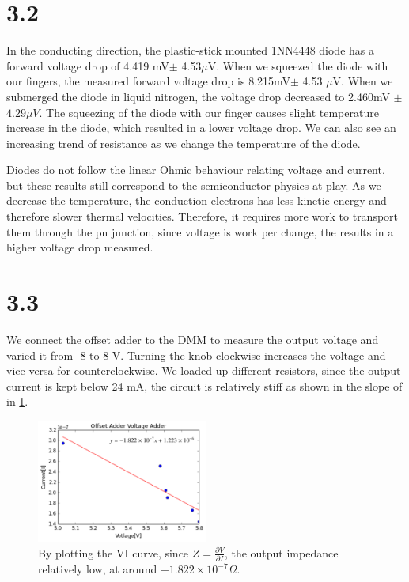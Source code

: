 \documentclass[authoryear, 12pt,5p, times]{elsarticle}
\begin{document}
\section*{3.2}
In the conducting direction, the plastic-stick mounted 1NN4448 diode has a forward voltage drop of 4.419 mV$\pm$ 4.53$\mu$V.  When we squeezed the diode with our fingers, the measured forward voltage drop is 8.215mV$\pm$ 4.53 $\mu$V. When we submerged the diode in liquid nitrogen, the voltage drop decreased to 2.460mV $\pm$ $4.29\mu V$. The squeezing of the diode with our finger causes slight temperature increase in the diode, which resulted in a lower voltage drop.  We can also see an increasing trend of resistance as we change the temperature of the diode.
\par Diodes do not follow the linear Ohmic behaviour relating voltage and current, but these results still correspond to the semiconductor physics at play. As we decrease the temperature, the conduction electrons has less kinetic energy and therefore slower thermal velocities. Therefore, it requires more work to transport them through the pn junction, since voltage is work per change, the results in a higher voltage drop measured. 
\section*{3.3}
We connect the offset adder to the DMM to measure the output voltage and varied it from -8 to 8 V. Turning the knob clockwise increases the voltage and vice versa for counterclockwise. We loaded up different resistors, since the output current is kept below 24 mA, the circuit is relatively stiff as shown in the slope of in \ref{3_3}. 
\begin{figure}[h!]
\center
\includegraphics[width=0.5\textwidth]{figure/3_3}
\caption{By plotting the VI curve, since $Z=\frac{\partial V}{\partial I}$, the output  impedance relatively low, at around $-1.822\times10^{-7} \Omega$.}
\label{3_3}
\end{figure}
\end{document}
